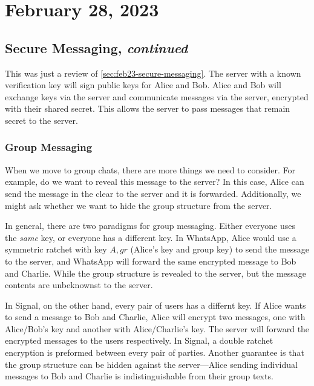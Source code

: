 \section{February 28, 2023}
\label{20230228}
\subsection{Secure Messaging, \emph{continued}}
This was just a review of \cref{sec:feb23-secure-messaging}. The server with a known verification key will sign public keys for Alice and Bob. Alice and Bob will exchange keys via the server and communicate messages via the server, encrypted with their shared secret. This allows the server to pass messages that remain secret to the server.


\subsubsection{Group Messaging}
When we move to group chats, there are more things we need to consider. For example, do we want to reveal this message to the server? In this case, Alice can send the message in the clear to the server and it is forwarded. Additionally, we might ask whether we want to hide the group structure from the server.


In general, there are two paradigms for group messaging. Either everyone uses the \emph{same} key, or everyone has a different key. In WhatsApp, Alice would use a symmetric ratchet with key $A, gr$ (Alice's key and group key) to send the message to the server, and WhatsApp will forward the same encrypted message to Bob and Charlie. While the group structure is revealed to the server, but the message contents are unbeknownst to the server.


In Signal, on the other hand, every pair of users has a differnt key. If Alice wants to send a message to Bob and Charlie, Alice will encrypt two messages, one with Alice/Bob's key and another with Alice/Charlie's key. The server will forward the encrypted messages to the users respectively. In Signal, a double ratchet encryption is preformed between every pair of parties. Another guarantee is that the group structure can be hidden against the server---Alice sending individual messages to Bob and Charlie is indistinguishable from their group texts.

